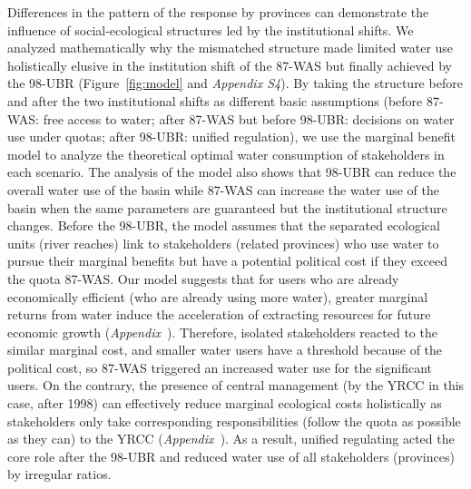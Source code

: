 \label{discussion-2}
Differences in the pattern of the response by provinces can demonstrate the influence of social-ecological structures led by the institutional shifts.
We analyzed mathematically why the mismatched structure made limited water use holistically elusive in the institution shift of the 87-WAS but finally achieved by the 98-UBR (Figure~\ref{fig:model} and \textit{Appendix S4}).
By taking the structure before and after the two institutional shifts as different basic assumptions (before 87-WAS: free access to water; after 87-WAS but before 98-UBR: decisions on water use under quotas; after 98-UBR: unified regulation), we use the marginal benefit model to analyze the theoretical optimal water consumption of stakeholders in each scenario.
The analysis of the model also shows that 98-UBR can reduce the overall water use of the basin while 87-WAS can increase the water use of the basin when the same parameters are guaranteed but the institutional structure changes.
Before the 98-UBR, the model assumes that the separated ecological units (river reaches) link to stakeholders (related provinces) who use water to pursue their marginal benefits but have a potential political cost if they exceed the quota 87-WAS.
Our model suggests that for users who are already economically efficient (who are already using more water), greater marginal returns from water induce the acceleration of extracting resources for future economic growth (\textit{Appendix~}).
Therefore, isolated stakeholders reacted to the similar marginal cost, and smaller water users have a threshold because of the political cost, so 87-WAS triggered an increased water use for the significant users.
On the contrary, the presence of central management (by the YRCC in this case, after 1998) can effectively reduce marginal ecological costs holistically as stakeholders only take corresponding responsibilities (follow the quota as possible as they can) to the YRCC (\textit{Appendix~}).
As a result, unified regulating acted the core role after the 98-UBR and reduced water use of all stakeholders (provinces) by irregular ratios.

